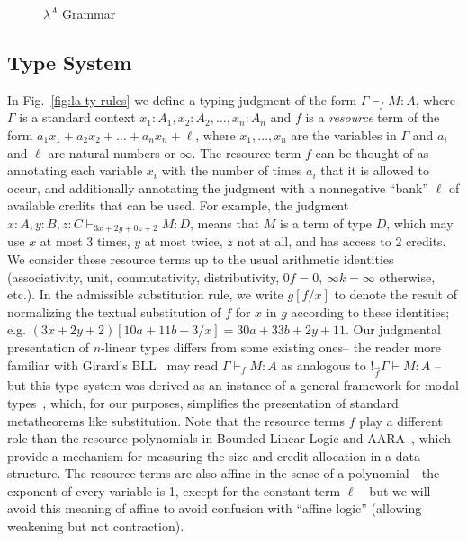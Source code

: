 \begin{figure}
  
  \vspace{-0.2in}
  \caption{$\lambda^A$ Grammar}
  \label{fig:la-bnf}
\end{figure}

\subsection{Type System}

In Fig.~\ref{fig:la-ty-rules} we define
a typing judgment of the form
$\Gamma \vdash_f M : A$, where $\Gamma$ is a standard context $x_1:A_1,
x_2:A_2, \ldots, x_n : A_n$ and $f$ is a \textit{resource} term of the
form $a_1 x_1 + a_2 x_2 + \ldots + a_n x_n + \ell$, where
$x_1,\ldots,x_n$ are the variables in $\Gamma$ and $a_i$ and $\ell$ are
natural numbers or $\infty$.  The resource term $f$ can be
thought of as annotating each variable $x_i$ with the number of times
$a_i$ that it is allowed to occur, and additionally annotating the
judgment with a nonnegative ``bank'' $\ell$ of available credits
that can be used.  For example, the judgment $x : A, y : B, z : C
\vdash_{3x+2y+0z+2} M : D$, means that $M$ is a term of type $D$, which
may use $x$ at most $3$ times, $y$ at most twice, $z$ not at all, and
has access to $2$ credits.  We consider these resource terms up to the
usual arithmetic identities (associativity, unit, commutativity,
distributivity, $0 f = 0$, $\infty k = \infty$ otherwise, etc.).  In the
admissible substitution rule, we write $g[f/x]$ to denote the result of
normalizing the textual substitution of $f$ for $x$ in $g$ according to
these identities; e.g. $(3x+2y+2)[10a+11b+3/x] = 30a+33b+2y+11$. 
Our judgmental presentation of $n$-linear types differs from some 
existing ones-- the reader more familiar with Girard's BLL~\cite{girard-et-al:tcs92:bll}
may read $\Gamma \vdash_f M : A$ as analogous to $!_{\vec{f}} \Gamma \vdash M : A$
-- but this type system was derived as an instance of a general framework for modal
types~\cite{lsr}, which, for our purposes, simplifies the presentation of standard 
metatheorems like substitution. Note that
the resource terms $f$ play a different role than the resource
polynomials in Bounded Linear Logic and AARA~\cite{girard-et-al:tcs92:bll,hoffmann-et-al:toplas12:multivariate-amortized}, 
which provide a mechanism for measuring the size and credit allocation in a
data structure.  The resource terms are also affine in the sense of a
polynomial---the exponent of every variable is 1, except for the constant term
$\ell$---but we will avoid this meaning of affine to avoid
confusion with ``affine logic'' (allowing weakening but not contraction).

